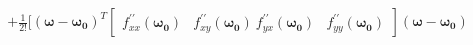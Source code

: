 \documentclass[preview]{standalone}
\begin{document}
\begin{align*}
+ \frac{1}{2 !}[ (\mathbf{\omega} - \mathbf{\omega_0})^T \begin{bmatrix} f_{xx}^{\prime \prime}(\mathbf{\omega_0}) & f_{xy}^{\prime \prime}(\mathbf{\omega_0})\ f_{yx}^{\prime \prime}(\mathbf{\omega_0}) & f_{yy}^{\prime \prime}(\mathbf{\omega_0})\end{bmatrix} (\mathbf{\omega} - \mathbf{\omega_0})
\end{align*}
\end{document}
